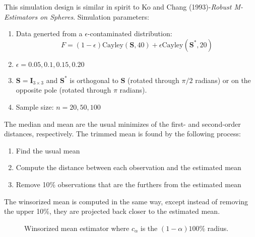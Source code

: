 \documentclass{article}\usepackage[]{graphicx}\usepackage[]{color}
\begin{document}
This simulation design is similar in spirit to Ko and Chang (1993)-\textit{Robust M-Estimators on Spheres}.  Simulation parameters:
\begin{enumerate}
\item Data generted from a $\epsilon$-contaminated distribution:
\[
F=(1-\epsilon)\text{Cayley}(\bm S,40)+\epsilon\text{Cayley}(\bm S^*,20)
\]
\item $\epsilon=0.05, 0.1, 0.15, 0.20$
\item $\bm S=\bm I_{3\times 3}$ and $\bm S^*$ is orthogonal to $\bm S$ (rotated through $\pi/2$ radians) or on the opposite pole (rotated through $\pi$ radians).
\item Sample size: $n=20,50,100$
\end{enumerate}

The median and mean are the usual minimizes of the first- and second-order distances, respectively.  The trimmed mean is found by the following process:
\begin{enumerate}
\item Find the usual mean 
\item Compute the distance between each observation and the estimated mean
\item Remove 10\% observations that are the furthers from the estimated mean
\end{enumerate}

The winsorized mean is computed in the same way, except instead of removing the upper 10\%, they are projected back closer to the estimated mean.

\begin{figure}
\begin{center}
\end{center}
\caption{Winsorized mean estimator where $c_\alpha$ is the $(1-\alpha)100\%$ radius.}
\label{fig:Huber}
\end{figure}
\end{document}
